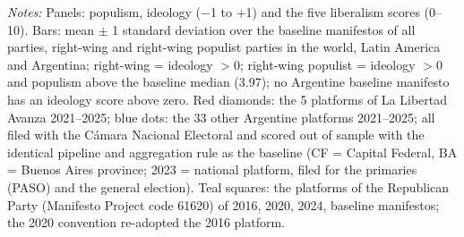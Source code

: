 \par\smallskip\begin{minipage}{\linewidth}\scriptsize\textit{Notes:} Panels: populism, ideology ($-$1 to +1) and the five liberalism scores (0--10). Bars: mean $\pm$ 1 standard deviation over the baseline manifestos of all parties, right-wing and right-wing populist parties in the world, Latin America and Argentina; right-wing = ideology $> 0$; right-wing populist = ideology $> 0$ and populism above the baseline median (3.97); no Argentine baseline manifesto has an ideology score above zero. Red diamonds: the 5 platforms of La Libertad Avanza 2021--2025; blue dots: the 33 other Argentine platforms 2021--2025; all filed with the C\'amara Nacional Electoral and scored out of sample with the identical pipeline and aggregation rule as the baseline (CF = Capital Federal, BA = Buenos Aires province; 2023 = national platform, filed for the primaries (PASO) and the general election). Teal squares: the platforms of the Republican Party (Manifesto Project code 61620) of 2016, 2020, 2024, baseline manifestos; the 2020 convention re-adopted the 2016 platform.\end{minipage}
